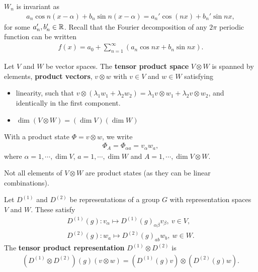 
$W_n$ is invariant as
\begin{align}
    a_n \cos n \left( x - \alpha \right) + b_n \sin n \left( x- \alpha \right) = a_n' \cos \left( n x \right) + b_n' \sin n x
,\end{align}
for some $a_n' , b_n' \in \mathbb{R}$. Recall that the Fourier decomposition of any $2\pi$ periodic function can be written
\begin{align}
    f\left( x \right) = a_0 + \sum_{n=1}^{\infty}  \left( a_n \cos n x + b_n \sin n x \right) 
.\end{align}

\begin{definition}
    Let $V$ and $W$ be vector spaces. The \textbf{tensor product space} $V \otimes W$ is spanned by elements, \textbf{product vectors}, $v \otimes w$ with $v \in V$ and $w \in W$ satisfying
    \begin{itemize}
        \item linearity, such that $v \otimes \left( \lambda_1 w_1 + \lambda_2 w_2 \right) = \lambda_1 v\otimes w_1 + \lambda_2 v \otimes w_2$, and identically in the first component.
        \item $\dim \left( V \otimes W \right)  = \left( \dim V \right)  \left( \dim W \right) $
    \end{itemize}
\end{definition}

With a product state $\Phi = v \otimes w$, we write
\begin{align}
    \Phi_A = \Phi_{\alpha a} = v_{\alpha} w_a
,\end{align}
where $\alpha = 1, \cdots, \dim V$, $a = 1, \cdots, \dim W$ and $A = 1, \cdots, \dim V \otimes W$.

Not all elements of $V \otimes W$ are product states (as they can be linear combinations).


\begin{definition}
    Let $D^{\left( 1 \right) }$ and $D^{\left( 2 \right) }$ be representations of a group $G$ with representation spaces $V$ and $W$. These satisfy
    \begin{align}
        D^{\left( 1 \right) }\left( g \right) : v_{\alpha} \mapsto D^{\left( 1 \right) }\left( g \right)_{\alpha \beta} v_\beta, ~v \in V, \\
        D^{\left( 2 \right) }\left( g \right) : w_{a} \mapsto D^{\left( 2 \right) }\left( g \right)_{a b} w_b, ~w \in W
    .\end{align}
    The \textbf{tensor product representation} $D^{\left( 1 \right) } \otimes D^{\left( 2 \right) }$ is
    \begin{align}
        \left( D^{\left( 1 \right) } \otimes D^{\left( 2 \right) } \right) \left( g \right) \left( v \otimes w \right) = \left( D^{\left( 1 \right) }\left( g \right) v \right) \otimes \left( D^{\left( 2 \right) }\left( g \right) w \right) 
    .\end{align}
\end{definition}

